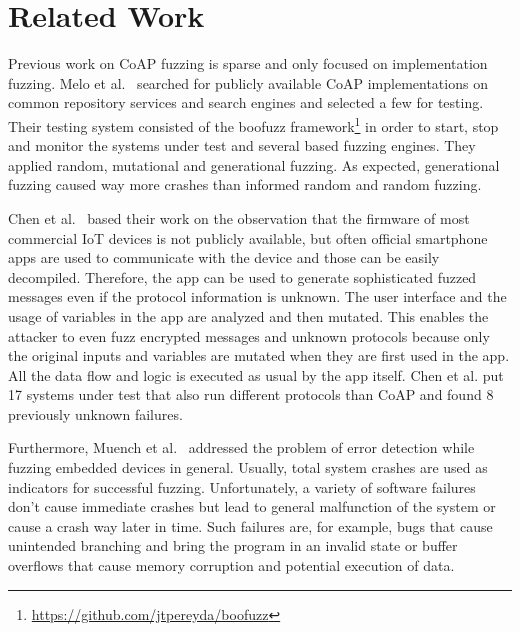 \section{Related Work}
\label{section:related_work}


Previous work on CoAP fuzzing is sparse and only focused on implementation fuzzing. Melo et al.~\cite{Melo2017RobustnessTO} searched for publicly available CoAP implementations on common repository services and search engines and selected a few for testing. Their testing system consisted of the boofuzz framework\footnote{\url{https://github.com/jtpereyda/boofuzz}} in order to start, stop and monitor the systems under test and several \scapy based fuzzing engines. They applied random, mutational and generational fuzzing. As expected, generational fuzzing caused way more crashes than informed random and random fuzzing.

Chen et al.~\cite{chen2018ndss} based their work on the observation that the firmware of most commercial IoT devices is not publicly available, but often official smartphone apps are used to communicate with the device and those can be easily decompiled. Therefore, the app can be used to generate sophisticated fuzzed messages even if the protocol information is unknown. The user interface and the usage of variables in the app are analyzed and then mutated. This enables the attacker to even fuzz encrypted messages and unknown protocols because only the original inputs and variables are mutated when they are first used in the app. All the data flow and logic is executed as usual by the app itself. Chen et al. put 17 systems under test that also run different protocols than CoAP and found 8 previously unknown failures.

Furthermore, Muench et al.~\cite{EURECOM+5417} addressed the problem of error detection while fuzzing embedded devices in general. Usually, total system crashes are used as indicators for successful fuzzing. Unfortunately, a variety of software failures don't cause immediate crashes but lead to general malfunction of the system or cause a crash way later in time. Such failures are, for example, bugs that cause unintended branching and bring the program in an invalid state or buffer overflows that cause memory corruption and potential execution of data.

